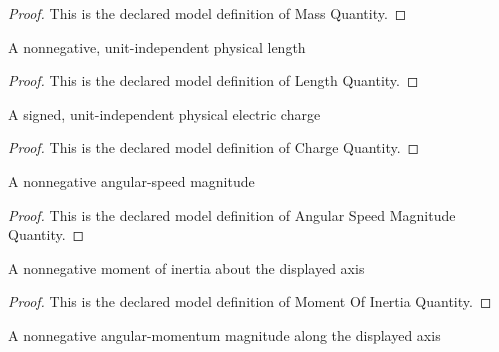 \begin{proof}
  This is the declared model definition of Mass Quantity.
\end{proof}
\begin{definition}
  \label{def:physics:phyx-mini-0563:phyxminiproblems-problemphyxmini0563-lengthquantity}
  A nonnegative, unit-independent physical length
\end{definition}
\begin{proof}
  This is the declared model definition of Length Quantity.
\end{proof}
\begin{definition}
  \label{def:physics:phyx-mini-0563:phyxminiproblems-problemphyxmini0563-chargequantity}
  A signed, unit-independent physical electric charge
\end{definition}
\begin{proof}
  This is the declared model definition of Charge Quantity.
\end{proof}
\begin{definition}
  \label{def:physics:phyx-mini-0563:phyxminiproblems-problemphyxmini0563-angularspeedmagnitudequantity}
  A nonnegative angular-speed magnitude
\end{definition}
\begin{proof}
  This is the declared model definition of Angular Speed Magnitude Quantity.
\end{proof}
\begin{definition}
  \label{def:physics:phyx-mini-0563:phyxminiproblems-problemphyxmini0563-momentofinertiaquantity}
  A nonnegative moment of inertia about the displayed axis
\end{definition}
\begin{proof}
  This is the declared model definition of Moment Of Inertia Quantity.
\end{proof}
\begin{definition}
  \label{def:physics:phyx-mini-0563:phyxminiproblems-problemphyxmini0563-angularmomentummagnitudequantity}
  A nonnegative angular-momentum magnitude along the displayed axis
\end{definition}
